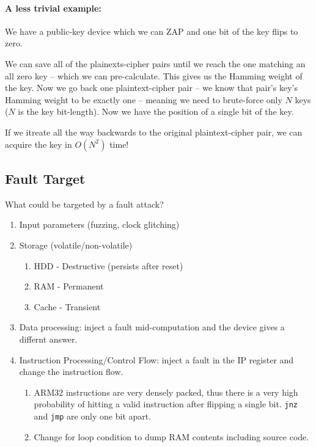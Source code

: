 \paragraph{A less trivial example:} We have a public-key device which we can ZAP and one bit of the key flips to zero.

We can save all of the plainexts-cipher pairs until we reach the one matching an all zero key -- which we can pre-calculate. This gives us the Hamming weight of the key.
Now we go back one plaintext-cipher pair -- we know that pair's key's Hamming weight to be exactly one -- meaning we need to brute-force only $N$ keys ($N$ is the key bit-length). Now we have the position of a single bit of the key.

If we itreate all the way backwards to the original plaintext-cipher pair, we can acquire the key in $O(N^2)$ time!

\subsection{Fault Target}
What could be targeted by a fault attack?
\begin{enumerate}
    \item Input parameters (fuzzing, clock glitching)
    \item Storage (volatile/non-volatile)
    \begin{enumerate}
		\item HDD - Destructive (persists after reset)
		\item RAM - Permanent
		\item Cache - Transient
	\end{enumerate}
    \item Data processing: inject a fault mid-computation and the device gives a differnt answer.
    \item Instruction Processing/Control Flow: inject a fault in the IP register and change the instruction flow.
    \begin{enumerate}
		\item ARM32 instructions are very densely packed, thus there is a very high probability of hitting a valid instruction after flipping a single bit. \texttt{jnz} and \texttt{jmp} are only one bit apart.
		\item Change for loop condition to dump RAM contents including source code. 
	\end{enumerate}
\end{enumerate}

